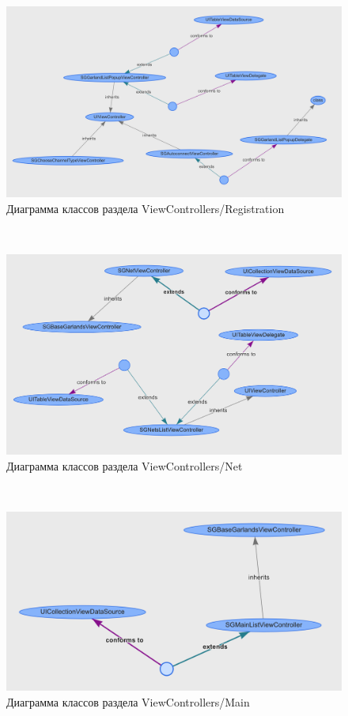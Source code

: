 \label{app:classDiagram}

~
\begin{figure}[H]
\centering
	\includegraphics[scale=0.5]{figures/diagrams/class/registration.png}
	\caption{Диаграмма классов раздела ViewControllers/Registration}
	\label{fig:appendices:classDiagram:registration}
\end{figure}
~
\begin{figure}[H]
\centering
	\includegraphics[scale=0.5]{figures/diagrams/class/net.png}
	\caption{Диаграмма классов раздела ViewControllers/Net}
	\label{fig:appendices:classDiagram:net}
\end{figure}
~
\begin{figure}[H]
\centering
	\includegraphics[scale=0.5]{figures/diagrams/class/mainList.png}
	\caption{Диаграмма классов раздела ViewControllers/Main}
	\label{fig:appendices:classDiagram:mainList}
\end{figure}
